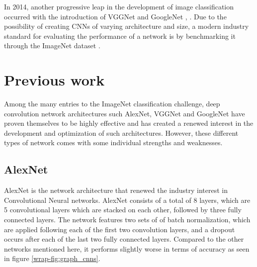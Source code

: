 \documentclass{kthreport}
\begin{document}
In 2014, another progressive leap in the development of image classification occurred with the introduction of VGGNet and GoogleNet \cite{simonyan2014very}, \cite{szegedy2016rethinking}.  Due to the possibility of creating CNNs of varying architecture and size, a modern industry standard for evaluating the performance of a network is by benchmarking it through the ImageNet dataset \cite{russakovsky2015imagenet}.


\section{Previous work}
\label{sec:PreviousWork}
Among the many entries to the ImageNet classification challenge, deep convolution network architectures such AlexNet, VGGNet and GoogleNet have proven themselves to be highly effective and has created a renewed interest in the development and optimization of such architectures. However, these different types of network comes with some individual strengths and weaknesses.

\subsection{AlexNet}
AlexNet is the network architecture that renewed the industry interest in Convolutional Neural networks. AlexNet consists of a total of 8 layers, which are 5 convolutional layers which are stacked on each other, followed by three fully connected layers. The network features two sets of of batch normalization, which are applied following each of the first two convolution layers, and a dropout occurs after each of the last two fully connected layers. Compared to the other networks mentioned here, it performs slightly worse in terms of accuracy as seen in figure \ref{wrap-fig:graph_cnns}.

\clearpage
\end{document}
